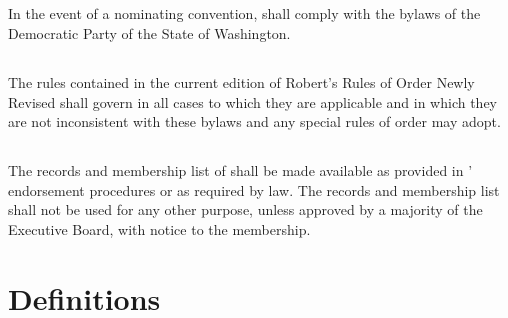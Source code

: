\subsection{}
In the event of a nominating convention, \thedistrict{} shall comply with the bylaws of the Democratic Party of the State of Washington.

\subsection{}
The rules contained in the current edition of Robert’s Rules of Order Newly Revised shall govern \thedistrict{} in all cases to which they are applicable and in which they are not inconsistent with these bylaws and any special rules of order \thedistrict{} may adopt.

\subsection{}
The records and membership list of \thedistrict{} shall be made available as provided in \thedistrict{}’ endorsement procedures or as required by law. The records and membership list shall not be used for any other purpose, unless approved by a majority of the Executive Board, with notice to the membership.

\section{Definitions} \label{defs}
